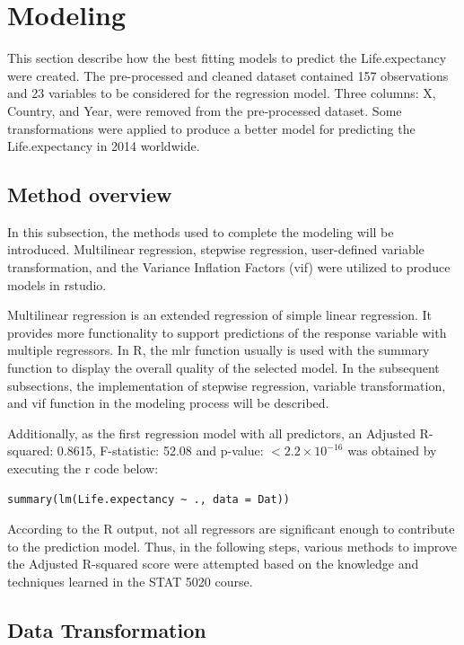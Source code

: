 \section{Modeling}
\label{sec:modeling}

This section describe how the best fitting models to predict the Life.expectancy were created. The pre-processed and cleaned dataset contained 157 observations and 23 variables to be considered for the regression model. Three columns: X, Country, and Year, were removed from the pre-processed dataset. Some transformations were applied to produce a better model for predicting the Life.expectancy in 2014 worldwide.

\subsection{Method overview}

In this subsection, the methods used to complete the modeling will be introduced. Multilinear regression, stepwise regression, user-defined variable transformation, and the Variance Inflation Factors (vif) were utilized to produce models in rstudio.

Multilinear regression is an extended regression of simple linear regression. It provides more functionality to support predictions of the response variable with multiple regressors. In R, the mlr function usually is used with the summary function to display the overall quality of the selected model. In the subsequent subsections, the implementation of stepwise regression, variable transformation, and vif function in the modeling process will be described.

Additionally, as the first regression model with all predictors, an Adjusted R-squared: 0.8615, F-statistic: 52.08 and p-value: $< 2.2\times 10^{-16}$ was obtained by executing the r code below:

\begin{verbatim}
summary(lm(Life.expectancy ~ ., data = Dat))
\end{verbatim}

According to the R output, not all regressors are significant enough to contribute to the prediction model. Thus, in the following steps, various methods to improve the Adjusted R-squared score were attempted based on the knowledge and techniques learned in the STAT 5020 course.

\subsection{Data Transformation}

